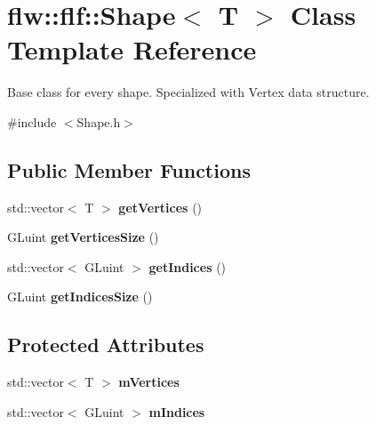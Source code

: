 \hypertarget{classflw_1_1flf_1_1Shape}{}\section{flw\+:\+:flf\+:\+:Shape$<$ T $>$ Class Template Reference}
\label{classflw_1_1flf_1_1Shape}


Base class for every shape. Specialized with Vertex data structure.  




{\ttfamily \#include $<$Shape.\+h$>$}

\subsection*{Public Member Functions}
\begin{DoxyCompactItemize}
\item 
\mbox{\label{classflw_1_1flf_1_1Shape_a0cd6cc27bdc9ccd786413a6b76ffe7ba}} 
std\+::vector$<$ T $>$ {\bfseries get\+Vertices} ()
\item 
\mbox{\label{classflw_1_1flf_1_1Shape_a787f47ca487ec7de0442209992f748f1}} 
G\+Luint {\bfseries get\+Vertices\+Size} ()
\item 
\mbox{\label{classflw_1_1flf_1_1Shape_a42b437a6e28b9a5d795a0cd478071720}} 
std\+::vector$<$ G\+Luint $>$ {\bfseries get\+Indices} ()
\item 
\mbox{\label{classflw_1_1flf_1_1Shape_a4df4a07e5802c88c770c427b6fc1bd46}} 
G\+Luint {\bfseries get\+Indices\+Size} ()
\end{DoxyCompactItemize}
\subsection*{Protected Attributes}
\begin{DoxyCompactItemize}
\item 
\mbox{\label{classflw_1_1flf_1_1Shape_ac44a4ee206337c5959292c264a748d2d}} 
std\+::vector$<$ T $>$ {\bfseries m\+Vertices}
\item 
\mbox{\label{classflw_1_1flf_1_1Shape_aa3544a00cc705c4eb3245c1328a52aae}} 
std\+::vector$<$ G\+Luint $>$ {\bfseries m\+Indices}
\end{DoxyCompactItemize}


